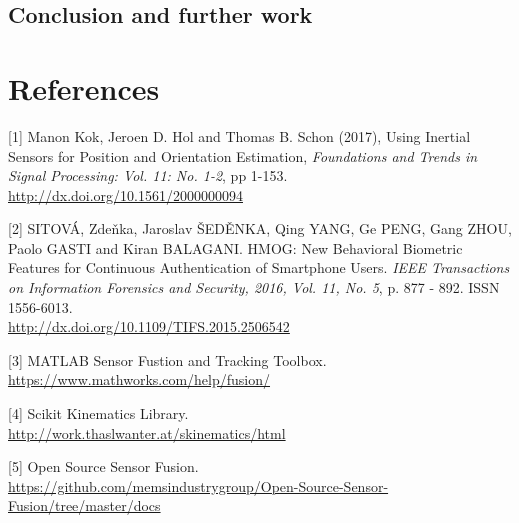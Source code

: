 \documentclass{article}
\begin{document}
\subsection{Conclusion and further work}






















\section*{References}

\small

[1] Manon Kok, Jeroen D. Hol and Thomas B. Schon (2017), Using
Inertial Sensors for Position and Orientation Estimation,
{\it Foundations and Trends in Signal Processing: Vol. 11: No. 1-2},
pp 1-153. \\ \url{http://dx.doi.org/10.1561/2000000094}

[2] SITOVÁ, Zdeňka, Jaroslav ŠEDĚNKA, Qing YANG, Ge PENG, Gang ZHOU,
Paolo GASTI and Kiran BALAGANI. HMOG: New Behavioral Biometric Features
for Continuous Authentication of Smartphone Users. {\it IEEE Transactions on
Information Forensics and Security, 2016, Vol. 11, No. 5}, p. 877 - 892.
ISSN 1556-6013. \\ \url{http://dx.doi.org/10.1109/TIFS.2015.2506542}

[3] MATLAB Sensor Fustion and Tracking Toolbox. \\ \url{https://www.mathworks.com/help/fusion/}

[4] Scikit Kinematics Library. \\ \url{http://work.thaslwanter.at/skinematics/html}

[5] Open Source Sensor Fusion. \\ \url{https://github.com/memsindustrygroup/Open-Source-Sensor-Fusion/tree/master/docs}
\end{document}
